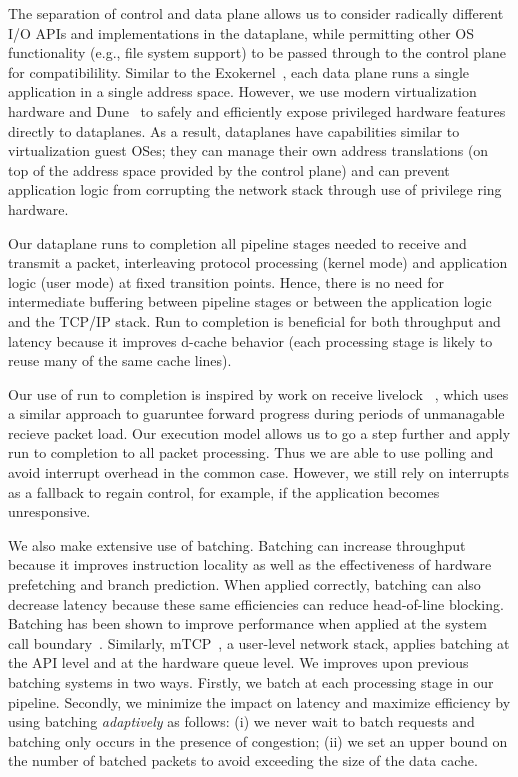 The separation of control and data plane allows us to consider radically
different I/O APIs and implementations in the dataplane, while
permitting other OS functionality (e.g., file system
support) to be passed through to the control plane for compatibilility.
Similar to the
Exokernel~\cite{DBLP:conf/sosp/EnglerKO95}, each data plane runs a
single application in a single address space. However,
we use modern virtualization hardware and Dune~\cite{dune} to
safely and efficiently expose privileged hardware features directly to
dataplanes. As a result, dataplanes have capabilities similar to
virtualization guest OSes; they can manage
their own address translations (on top of the address space provided by
the control plane) and can prevent application logic from corrupting
the network stack through use of privilege ring hardware.



 Our dataplane
runs to completion all pipeline stages needed to receive and transmit a
packet, interleaving protocol processing (kernel mode) and application
logic (user mode) at fixed transition points. Hence, there is no need for intermediate
buffering between pipeline stages or between the application logic and
the TCP/IP stack. Run to completion is beneficial for both throughput
and latency because it improves d-cache behavior (each processing stage
is likely to reuse many of the same cache lines).

Our use of run to completion is inspired by work on receive livelock
~\cite{receive-livelock}, which uses a similar approach
to guaruntee forward progress during periods of unmanagable recieve packet load.
Our execution model allows us to go a step further and apply run to completion to
all packet processing. Thus we are able to use polling and avoid interrupt overhead
in the common case. However, we still rely on interrupts as a fallback to regain control,
for example, if the application becomes unresponsive.

We also make extensive use of batching. Batching can increase throughput because it
improves instruction locality as well as the effectiveness of hardware
prefetching and branch prediction. When applied correctly, batching can also
decrease latency because these same efficiencies can reduce head-of-line blocking.
Batching has been shown to improve performance when applied at the system call
boundary~\cite{DBLP:conf/osdi/HanMCR12, DBLP:conf/osdi/SoaresS10}. Similarly,
mTCP~\cite{jeong2014mtcp}, a user-level network stack, applies batching
at the API level and at the hardware queue level.
We improves upon previous batching systems in two ways.
Firstly, we batch at each processing stage in our pipeline. Secondly, we
minimize the impact on latency and maximize efficiency by using batching
\emph{adaptively} as follows: (i) we never wait to batch requests and batching
only occurs in the presence of congestion; (ii) we set an upper bound on
the number of batched packets to avoid exceeding the size of the data cache.

